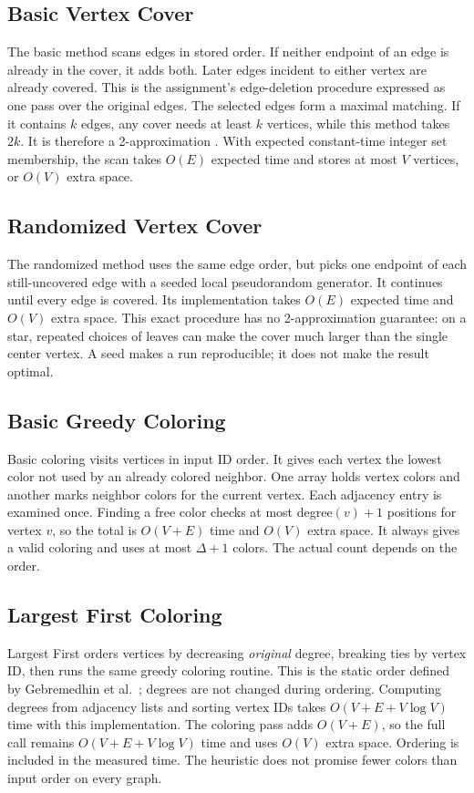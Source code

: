 \documentclass[acmsmall,nonacm]{acmart}
\begin{document}
\subsection{Basic Vertex Cover}
The basic method scans edges in stored order. If neither endpoint of an edge is already in the cover, it adds both. Later edges incident to either vertex are already covered. This is the assignment's edge-deletion procedure expressed as one pass over the original edges. The selected edges form a maximal matching. If it contains $k$ edges, any cover needs at least $k$ vertices, while this method takes $2k$. It is therefore a 2-approximation \cite{alberta}. With expected constant-time integer set membership, the scan takes $O(E)$ expected time and stores at most $V$ vertices, or $O(V)$ extra space.

\subsection{Randomized Vertex Cover}
The randomized method uses the same edge order, but picks one endpoint of each still-uncovered edge with a seeded local pseudorandom generator. It continues until every edge is covered. Its implementation takes $O(E)$ expected time and $O(V)$ extra space. This exact procedure has no 2-approximation guarantee: on a star, repeated choices of leaves can make the cover much larger than the single center vertex. A seed makes a run reproducible; it does not make the result optimal.

\subsection{Basic Greedy Coloring}
Basic coloring visits vertices in input ID order. It gives each vertex the lowest color not used by an already colored neighbor. One array holds vertex colors and another marks neighbor colors for the current vertex. Each adjacency entry is examined once. Finding a free color checks at most degree$(v)+1$ positions for vertex $v$, so the total is $O(V+E)$ time and $O(V)$ extra space. It always gives a valid coloring and uses at most $\Delta+1$ colors. The actual count depends on the order.

\subsection{Largest First Coloring}
Largest First orders vertices by decreasing \emph{original} degree, breaking ties by vertex ID, then runs the same greedy coloring routine. This is the static order defined by Gebremedhin et al.\ \cite{gebremedhin}; degrees are not changed during ordering. Computing degrees from adjacency lists and sorting vertex IDs takes $O(V+E+V\log V)$ time with this implementation. The coloring pass adds $O(V+E)$, so the full call remains $O(V+E+V\log V)$ time and uses $O(V)$ extra space. Ordering is included in the measured time. The heuristic does not promise fewer colors than input order on every graph.
\end{document}

